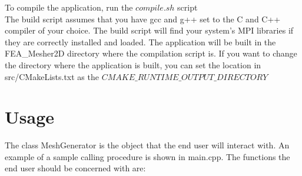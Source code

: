\documentclass[manuscript, screen]{acmart}
\begin{document}
To compile the application, run the $compile.sh$ script\\
The build script assumes that you have gcc and g++ set to the C and C++ compiler of your choice. The build script will find your system's MPI libraries if they are correctly installed and loaded. The application will be built in the FEA\_Mesher2D directory where the compilation script is. If you want to change the directory where the application is built, you can set the location in src/CMakeLists.txt as the $CMAKE\_RUNTIME\_OUTPUT\_DIRECTORY$

\section{Usage}
The class MeshGenerator is the object that the end user will interact with. An example of a sample calling procedure is shown in main.cpp. The functions the end user should be concerned with are:
\end{document}
